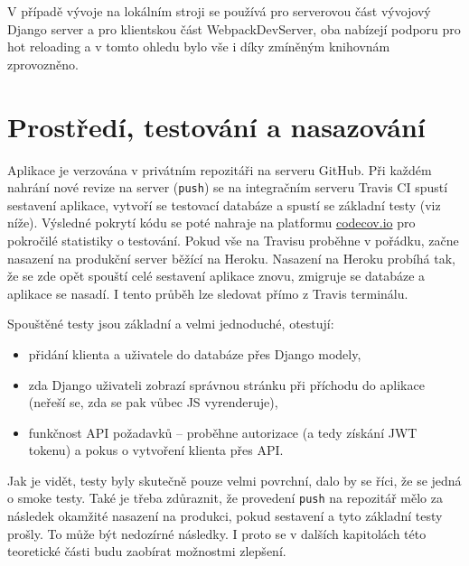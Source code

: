 V případě vývoje na lokálním stroji se používá pro serverovou část vývojový Django server a pro klientskou část WebpackDevServer, oba nabízejí podporu pro hot reloading a v tomto ohledu bylo vše i díky zmíněným knihovnám zprovozněno.

\section{Prostředí, testování a nasazování}
Aplikace je verzována v privátním repozitáři na serveru GitHub. Při každém nahrání nové revize na server (\verb|push|) se na integračním serveru Travis CI spustí sestavení aplikace, vytvoří se testovací databáze a spustí se základní testy (viz níže). Výsledné pokrytí kódu se poté nahraje na platformu \href{https://codecov.io/}{codecov.io} pro pokročilé statistiky o testování. Pokud vše na Travisu proběhne v pořádku, začne nasazení na produkční server běžící na Heroku. Nasazení na Heroku probíhá tak, že se zde opět spouští celé sestavení aplikace znovu, zmigruje se databáze a aplikace se nasadí. I tento průběh lze sledovat přímo z Travis terminálu.

Spouštěné testy jsou základní a velmi jednoduché, otestují:
\begin{itemize}
    \item přidání klienta a uživatele do databáze přes Django modely,
    \item zda Django uživateli zobrazí správnou stránku při příchodu do aplikace (neřeší se, zda se pak vůbec JS vyrenderuje),
    \item funkčnost API požadavků -- proběhne autorizace (a tedy získání JWT tokenu) a pokus o vytvoření klienta přes API.
\end{itemize}

Jak je vidět, testy byly skutečně pouze velmi povrchní, dalo by se říci, že se jedná o smoke testy. Také je třeba zdůraznit, že provedení \verb|push| na repozitář mělo za následek okamžité nasazení na produkci, pokud sestavení a tyto základní testy prošly. To může být nedozírné následky. I proto se v dalších kapitolách této teoretické části budu zaobírat možnostmi zlepšení.

